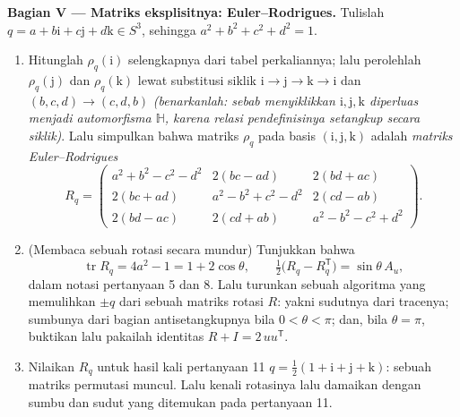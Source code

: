 \begin{problem}
\medskip
\noindent\textbf{Bagian V --- Matriks eksplisitnya:
Euler--Rodrigues.} Tulislah $q = a + b\mathrm i + c\mathrm j +
d\mathrm k \in S^3$, sehingga $a^2 + b^2 + c^2 + d^2 = 1$.
\begin{enumerate}[resume]
  \item Hitunglah $\rho_q(\mathrm i)$ selengkapnya dari
        tabel perkaliannya; lalu perolehlah $\rho_q(\mathrm
        j)$ dan $\rho_q(\mathrm k)$ lewat substitusi
        siklik $\mathrm i \to \mathrm j \to \mathrm k
        \to \mathrm i$ dan $(b, c, d) \to (c, d, b)$
        \emph{(benarkanlah: sebab menyiklikkan $\mathrm i, \mathrm j,
        \mathrm k$ diperluas menjadi automorfisma $\mathbb
        H$, karena relasi pendefinisinya setangkup secara
        siklik)}. Lalu simpulkan bahwa matriks $\rho_q$
        pada basis $(\mathrm i, \mathrm j, \mathrm k)$ adalah
        \emph{matriks Euler--Rodrigues}
        \[
        R_q = \begin{pmatrix}
        a^2 + b^2 - c^2 - d^2 & 2(bc - ad) & 2(bd + ac)\\
        2(bc + ad) & a^2 - b^2 + c^2 - d^2 & 2(cd - ab)\\
        2(bd - ac) & 2(cd + ab) & a^2 - b^2 - c^2 + d^2
        \end{pmatrix}.
        \]
  \item (Membaca sebuah rotasi secara mundur) Tunjukkan bahwa
        \[
        \operatorname{tr}R_q = 4a^2 - 1 = 1 + 2\cos\theta,
        \qquad
        \tfrac12\bigl(R_q - R_q^{\mathsf T}\bigr) =
        \sin\theta\,A_u,
        \]
        dalam notasi pertanyaan 5 dan 8. Lalu turunkan sebuah
        algoritma yang memulihkan $\pm q$ dari sebuah matriks rotasi
        $R$: yakni sudutnya dari tracenya; sumbunya dari
        bagian antisetangkupnya bila $0 < \theta < \pi$; dan,
        bila $\theta = \pi$, buktikan lalu pakailah identitas $R
        + I = 2\,uu^{\mathsf T}$.
  \item Nilaikan $R_q$ untuk hasil kali pertanyaan 11 $q =
        \frac12(1 + \mathrm i + \mathrm j + \mathrm k)$: sebuah
        matriks permutasi muncul. Lalu kenali rotasinya
        lalu damaikan dengan sumbu dan sudut yang ditemukan pada
        pertanyaan 11.
\end{enumerate}


\end{problem}
